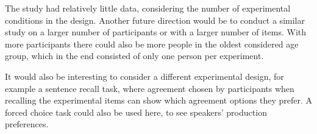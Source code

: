 The study had relatively little data, considering the number of experimental conditions in the design. Another future direction would be to conduct a similar study on a larger number of participants or with a larger number of items. With more participants there could also be more people in the oldest considered age group, which in the end consisted of only one person per experiment.

It would also be interesting to consider a different experimental design, for example a sentence recall task, where agreement chosen by participants when recalling the experimental items can show which agreement options they prefer. A forced choice task could also be used here, to see speakers' production preferences.
